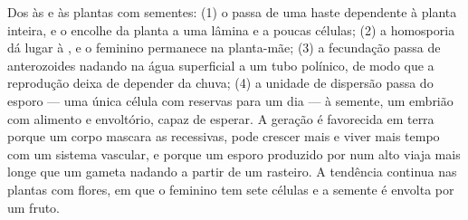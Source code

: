 \begin{proposition}\label{prop:b2:plant-life-cycles:trends}
Dos  às  e às plantas com sementes: (1) o 
passa de uma haste dependente à planta inteira, e o  encolhe
da planta a uma lâmina e a poucas células; (2) a homosporia dá lugar
à , e o  feminino permanece na planta-mãe;
(3) a fecundação passa de anterozoides nadando na água superficial a
um tubo polínico, de modo que a reprodução deixa de depender da chuva;
(4) a unidade de dispersão passa do esporo --- uma única célula com
reservas para um dia --- à semente, um embrião com alimento e
envoltório, capaz de esperar. A geração  é favorecida em terra
porque um corpo  mascara as  recessivas, pode crescer
mais e viver mais tempo com um sistema vascular, e porque um esporo
produzido por  num  alto viaja mais longe que um
gameta nadando a partir de um  rasteiro. A tendência
continua nas plantas com flores, em que o  feminino tem sete
células e a semente é envolta por um fruto.
\end{proposition}

